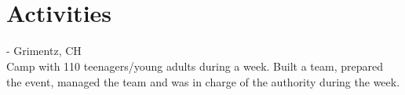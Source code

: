 \documentclass[mm, 11pt]{simple_style}
\begin{document}
\begin{resume}
\begin{project}
{  }\\
\end{project}\\
\sectionline

\section{Activities}
 - Grimentz, CH \\
Camp with 110 teenagers/young adults during a week. Built a team, prepared the event, managed the team and was in charge of the authority during the week.\\
\end{resume}
\end{document}
